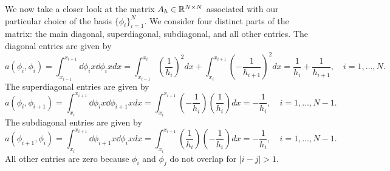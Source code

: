 
We now take a closer look at the matrix $A_h \in \mathbb{R}^{N \times N}$ associated with our particular choice of the basis $\{\phi_i\}_{i=1}^N$.  We consider four distinct parts of the matrix: the main diagonal, superdiagonal, subdiagonal, and all other entries.  The diagonal entries are given by 
\begin{equation*}
  a(\phi_i,\phi_i) = \int_{x_{i-1}}^{x_{i+1}} \dd{\phi_i}{x} \dd{\phi_i}{x} dx
  = \int_{x_{i-1}}^{x_{i}} \left( \frac{1}{h_i} \right)^2 dx +
  \int_{x_{i}}^{x_{i+1}} \left( - \frac{1}{h_{i+1}} \right)^2 dx
  = \frac{1}{h_i} + \frac{1}{h_{i+1}}, \quad i = 1,\dots,N.
\end{equation*}
The superdiagonal entries are given by
\begin{equation*}
  a(\phi_i,\phi_{i+1}) =
  \int_{x_i}^{x_{i+1}} \dd{\phi_i}{x} \dd{\phi_{i+1}}{x} dx
  = \int_{x_i}^{x_{i+1}} \left( - \frac{1}{h_i} \right) \left( \frac{1}{h_i} \right) dx
  = - \frac{1}{h_i}, \quad i = 1,\dots,N-1.
\end{equation*}
The subdiagonal entries are given by
\begin{equation*}
  a(\phi_{i+1},\phi_i) =
  \int_{x_i}^{x_{i+1}} \dd{\phi_{i+1}}{x} \dd{\phi_i}{x} dx
  = \int_{x_i}^{x_{i+1}}  \left( \frac{1}{h_i} \right) \left( - \frac{1}{h_i} \right) dx
  = - \frac{1}{h_i}, \quad i = 1,\dots,N-1.
\end{equation*}
All other entries are zero because $\phi_i$ and $\phi_j$ do not overlap for $|i -j| > 1$.

